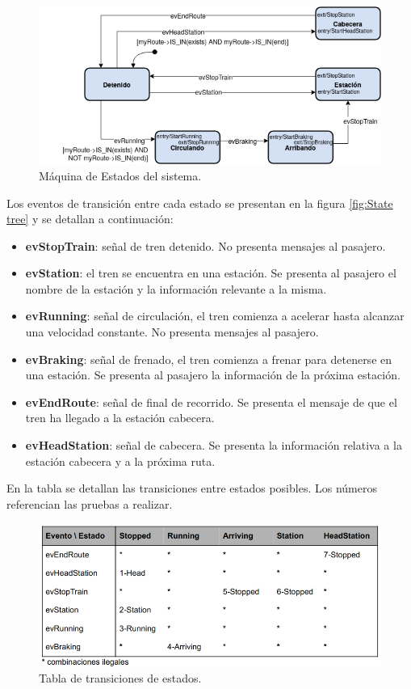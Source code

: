 \documentclass[
11pt, %
]{charter}
\begin{document}
\begin{figure}[htpb]
\centering 
\includegraphics[width=1\textwidth]{./Pics/Statechart.png}
\caption{Máquina de Estados del sistema.}
\label{fig:Statechart}
\end{figure}

Los eventos de transición entre cada estado se presentan en la figura \ref{fig:State tree} y se detallan a continuación:

\begin{itemize}
\item \textbf{evStopTrain}: señal de tren detenido. No presenta mensajes al pasajero.
\item \textbf{evStation}: el tren se encuentra en una estación. Se presenta al pasajero el nombre de
la estación y la información relevante a la misma.
\item \textbf{evRunning}: señal de circulación, el tren comienza a acelerar hasta alcanzar una
velocidad constante. No presenta mensajes al pasajero.
\item \textbf{evBraking}: señal de frenado, el tren comienza a frenar para detenerse en una estación.
Se presenta al pasajero la información de la próxima estación.
\item \textbf{evEndRoute}: señal de final de recorrido. Se presenta el mensaje de que el tren ha
llegado a la estación cabecera.
\item \textbf{evHeadStation}: señal de cabecera. Se presenta la información relativa a la estación cabecera y a la próxima ruta.
\end{itemize}

En la tabla se detallan las transiciones entre estados posibles. Los números referencian las pruebas a realizar.

\begin{figure}[htpb]
\centering 
\includegraphics[width=1\textwidth]{./Pics/TablaStatechart.1.png}
\caption{Tabla de transiciones de estados.}
\label{fig:State transition table}
\end{figure}
\end{document}
